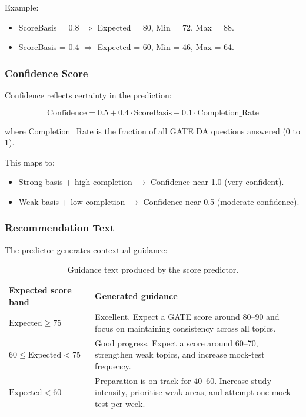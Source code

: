 \documentclass[sigconf,authordraft,twoside]{acmart}
\begin{document}
Example:
\begin{itemize}
\item ScoreBasis = 0.8 $\Rightarrow$ Expected = 80, Min = 72, Max = 88.
\item ScoreBasis = 0.4 $\Rightarrow$ Expected = 60, Min = 46, Max = 64.
\end{itemize}

\subsubsection{Confidence Score}

Confidence reflects certainty in the prediction:

\begin{equation}
\text{Confidence} = 0.5 + 0.4 \cdot \text{ScoreBasis} + 0.1 \cdot \text{Completion\_Rate}
\end{equation}

where Completion\_Rate is the fraction of all GATE DA questions answered (0 to 1).

This maps to:
\begin{itemize}
\item Strong basis + high completion $\to$ Confidence near 1.0 (very confident).
\item Weak basis + low completion $\to$ Confidence near 0.5 (moderate confidence).
\end{itemize}

\subsubsection{Recommendation Text}

The predictor generates contextual guidance:

\begin{table}[t]
\centering
\footnotesize
\begin{tabularx}{\columnwidth}{>{\raggedright\arraybackslash}p{} X}
\toprule
\textbf{Expected score band} & \textbf{Generated guidance} \\
\midrule
$\text{Expected} \geq 75$ & Excellent. Expect a GATE score around 80--90 and focus on maintaining consistency across all topics. \\
$60 \leq \text{Expected} < 75$ & Good progress. Expect a score around 60--70, strengthen weak topics, and increase mock-test frequency. \\
$\text{Expected} < 60$ & Preparation is on track for 40--60. Increase study intensity, prioritise weak areas, and attempt one mock test per week. \\
\bottomrule
\end{tabularx}
\caption{Guidance text produced by the score predictor.}
\end{table}
\end{document}
